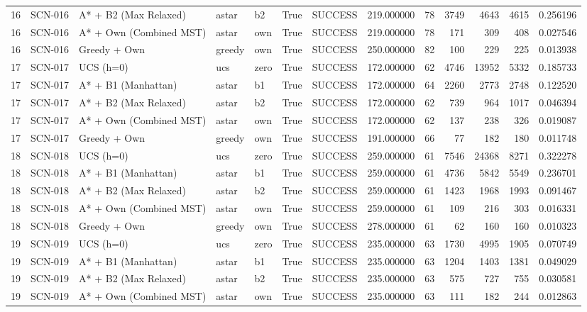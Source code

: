 \begin{table}[htbp]
\begin{tabular}{rllllrlrrrrrr}
16 & SCN-016 & A* + B2 (Max Relaxed) & astar & b2 & True & SUCCESS & 219.000000 & 78 & 3749 & 4643 & 4615 & 0.256196 \\
16 & SCN-016 & A* + Own (Combined MST) & astar & own & True & SUCCESS & 219.000000 & 78 & 171 & 309 & 408 & 0.027546 \\
16 & SCN-016 & Greedy + Own & greedy & own & True & SUCCESS & 250.000000 & 82 & 100 & 229 & 225 & 0.013938 \\
17 & SCN-017 & UCS (h=0) & ucs & zero & True & SUCCESS & 172.000000 & 62 & 4746 & 13952 & 5332 & 0.185733 \\
17 & SCN-017 & A* + B1 (Manhattan) & astar & b1 & True & SUCCESS & 172.000000 & 64 & 2260 & 2773 & 2748 & 0.122520 \\
17 & SCN-017 & A* + B2 (Max Relaxed) & astar & b2 & True & SUCCESS & 172.000000 & 62 & 739 & 964 & 1017 & 0.046394 \\
17 & SCN-017 & A* + Own (Combined MST) & astar & own & True & SUCCESS & 172.000000 & 62 & 137 & 238 & 326 & 0.019087 \\
17 & SCN-017 & Greedy + Own & greedy & own & True & SUCCESS & 191.000000 & 66 & 77 & 182 & 180 & 0.011748 \\
18 & SCN-018 & UCS (h=0) & ucs & zero & True & SUCCESS & 259.000000 & 61 & 7546 & 24368 & 8271 & 0.322278 \\
18 & SCN-018 & A* + B1 (Manhattan) & astar & b1 & True & SUCCESS & 259.000000 & 61 & 4736 & 5842 & 5549 & 0.236701 \\
18 & SCN-018 & A* + B2 (Max Relaxed) & astar & b2 & True & SUCCESS & 259.000000 & 61 & 1423 & 1968 & 1993 & 0.091467 \\
18 & SCN-018 & A* + Own (Combined MST) & astar & own & True & SUCCESS & 259.000000 & 61 & 109 & 216 & 303 & 0.016331 \\
18 & SCN-018 & Greedy + Own & greedy & own & True & SUCCESS & 278.000000 & 61 & 62 & 160 & 160 & 0.010323 \\
19 & SCN-019 & UCS (h=0) & ucs & zero & True & SUCCESS & 235.000000 & 63 & 1730 & 4995 & 1905 & 0.070749 \\
19 & SCN-019 & A* + B1 (Manhattan) & astar & b1 & True & SUCCESS & 235.000000 & 63 & 1204 & 1403 & 1381 & 0.049029 \\
19 & SCN-019 & A* + B2 (Max Relaxed) & astar & b2 & True & SUCCESS & 235.000000 & 63 & 575 & 727 & 755 & 0.030581 \\
19 & SCN-019 & A* + Own (Combined MST) & astar & own & True & SUCCESS & 235.000000 & 63 & 111 & 182 & 244 & 0.012863 \\

\end{tabular}
\end{table}
